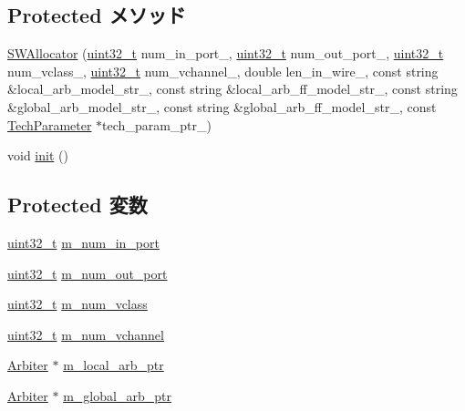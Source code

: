 \subsection*{Protected メソッド}
\begin{DoxyCompactItemize}
\item 
\hyperlink{classSWAllocator_a658f3c3ccc639bbbdd0b35825d28d381}{SWAllocator} (\hyperlink{Type_8hh_a435d1572bf3f880d55459d9805097f62}{uint32\_\-t} num\_\-in\_\-port\_\-, \hyperlink{Type_8hh_a435d1572bf3f880d55459d9805097f62}{uint32\_\-t} num\_\-out\_\-port\_\-, \hyperlink{Type_8hh_a435d1572bf3f880d55459d9805097f62}{uint32\_\-t} num\_\-vclass\_\-, \hyperlink{Type_8hh_a435d1572bf3f880d55459d9805097f62}{uint32\_\-t} num\_\-vchannel\_\-, double len\_\-in\_\-wire\_\-, const string \&local\_\-arb\_\-model\_\-str\_\-, const string \&local\_\-arb\_\-ff\_\-model\_\-str\_\-, const string \&global\_\-arb\_\-model\_\-str\_\-, const string \&global\_\-arb\_\-ff\_\-model\_\-str\_\-, const \hyperlink{classTechParameter}{TechParameter} $\ast$tech\_\-param\_\-ptr\_\-)
\item 
void \hyperlink{classSWAllocator_a02fd73d861ef2e4aabb38c0c9ff82947}{init} ()
\end{DoxyCompactItemize}
\subsection*{Protected 変数}
\begin{DoxyCompactItemize}
\item 
\hyperlink{Type_8hh_a435d1572bf3f880d55459d9805097f62}{uint32\_\-t} \hyperlink{classSWAllocator_aac6d2a4ff86073212e8ef4ac53742ddc}{m\_\-num\_\-in\_\-port}
\item 
\hyperlink{Type_8hh_a435d1572bf3f880d55459d9805097f62}{uint32\_\-t} \hyperlink{classSWAllocator_a56cb909217f28866d2a08a40adb3ef08}{m\_\-num\_\-out\_\-port}
\item 
\hyperlink{Type_8hh_a435d1572bf3f880d55459d9805097f62}{uint32\_\-t} \hyperlink{classSWAllocator_ac6cc31c075b331538b0aaa0bb593b2e3}{m\_\-num\_\-vclass}
\item 
\hyperlink{Type_8hh_a435d1572bf3f880d55459d9805097f62}{uint32\_\-t} \hyperlink{classSWAllocator_ac0b1d8a0523e7c7ce285c7917a764c9f}{m\_\-num\_\-vchannel}
\item 
\hyperlink{classArbiter}{Arbiter} $\ast$ \hyperlink{classSWAllocator_a3fec644111569687c929cb731f8b34b6}{m\_\-local\_\-arb\_\-ptr}
\item 
\hyperlink{classArbiter}{Arbiter} $\ast$ \hyperlink{classSWAllocator_a6d083f13327cb48999835d4710329be8}{m\_\-global\_\-arb\_\-ptr}
\end{DoxyCompactItemize}


